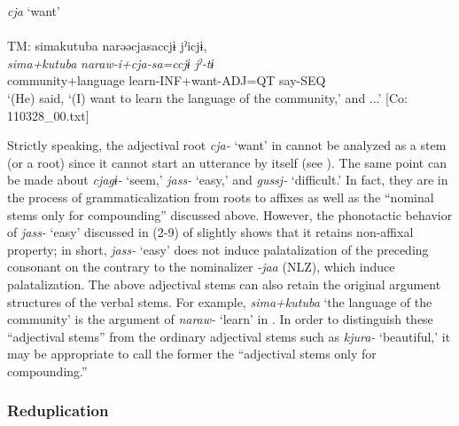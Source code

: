 \ea  \textit{cja} ‘want’ \label{ex:4.36}\\\\
\glll  TM:  simakutuba   narəəcjasaccjɨ  jˀicjɨ,\\
    \textit{sima+kutuba}  \textit{naraw-i+cja{}-sa=ccjɨ  jˀ-tɨ}\\
    community+language  learn-INF+want-ADJ=QT  say-SEQ\\
    \glt     ‘(He) said, ‘(I) want to learn the language of the community,’ and ...’ [Co: 110328\_00.txt]
\z

Strictly speaking, the adjectival root \textit{cja-} ‘want’ in  cannot be analyzed as a stem (or a root) since it cannot start an utterance by itself (see ). The same point can be made about \textit{cjagɨ-} ‘seem,’ \textit{jass-} ‘easy,’ and \textit{gussj-} ‘difficult.’ In fact, they are in the process of grammaticalization from roots to affixes as well as the “nominal stems only for compounding” discussed above. However, the phonotactic behavior of \textit{jass-} ‘easy’ discussed in (2-9) of  slightly shows that it retains non-affixal property; in short, \textit{jass-} ‘easy’ does not induce palatalization of the preceding consonant on the contrary to the nominalizer \textit{{}-jaa} (NLZ), which induce palatalization. The above adjectival stems can also retain the original argument structures of the verbal stems. For example, \textit{sima+kutuba} ‘the language of the community’ is the argument of \textit{naraw-} ‘learn’ in . In order to distinguish these “adjectival stems” from the ordinary adjectival stems such as \textit{kjura-} ‘beautiful,’ it may be appropriate to call the former the “adjectival stems only for compounding.”

\subsubsection{Reduplication}\label{sec:4.2.3.3}

